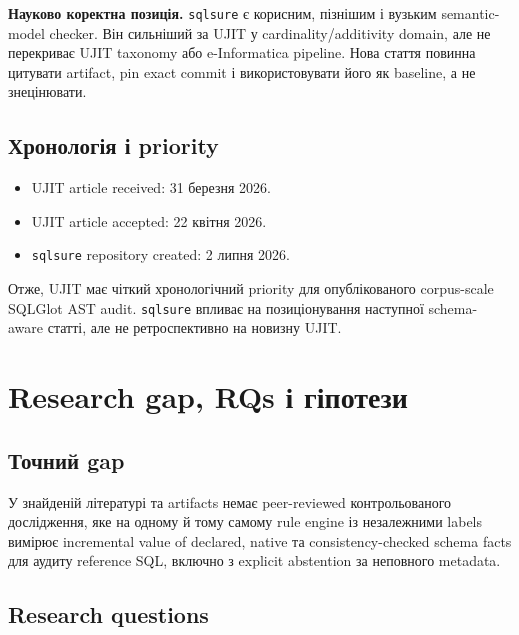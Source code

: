 \documentclass[11pt,a4paper]{article}
\begin{document}
\begin{keybox}
\textbf{Науково коректна позиція.} \texttt{sqlsure} є корисним, пізнішим і вузьким
semantic-model checker. Він сильніший за UJIT у cardinality/additivity domain, але
не перекриває UJIT taxonomy або e-Informatica pipeline. Нова стаття повинна
цитувати artifact, pin exact commit і використовувати його як baseline, а не
знецінювати.
\end{keybox}

\subsection{Хронологія і priority}

\begin{itemize}
\item UJIT article received: 31 березня 2026.
\item UJIT article accepted: 22 квітня 2026.
\item \texttt{sqlsure} repository created: 2 липня 2026.
\end{itemize}

Отже, UJIT має чіткий хронологічний priority для опублікованого corpus-scale
SQLGlot AST audit. \texttt{sqlsure} впливає на позиціонування наступної
schema-aware статті, але не ретроспективно на новизну UJIT.

\section{Research gap, RQs і гіпотези}

\subsection{Точний gap}

\begin{thesisbox}
У знайденій літературі та artifacts немає peer-reviewed контрольованого дослідження,
яке на одному й тому самому rule engine із незалежними labels вимірює incremental
value of declared, native та consistency-checked schema facts для аудиту reference
SQL, включно з explicit abstention за неповного metadata.
\end{thesisbox}

\subsection{Research questions}
\end{document}
